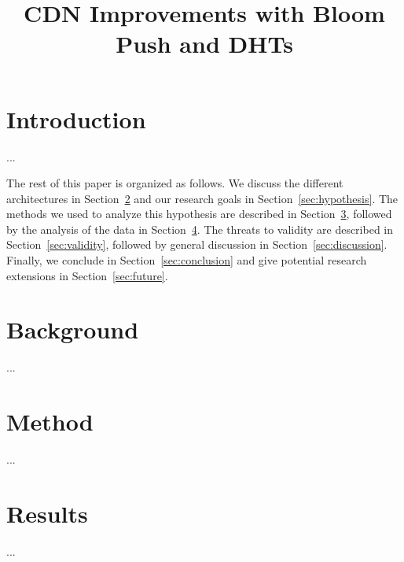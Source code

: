 \documentclass[conference]{IEEEtran}
\begin{document}
\title{CDN Improvements with Bloom Push and DHTs}

\author{
	\and
}

\maketitle
\thispagestyle{plain}
\pagestyle{plain}

\section{Introduction}\label{sec:intro}
...

The rest of this paper is organized as follows.  We discuss the different architectures in Section~\ref{sec:back} and our research goals in Section~\ref{sec:hypothesis}.  The methods we used to analyze this hypothesis are described in Section~\ref{sec:method}, followed by the analysis of the data in Section~\ref{sec:results}.  The threats to validity are described in Section~\ref{sec:validity}, followed by general discussion in Section~\ref{sec:discussion}.  Finally, we conclude in Section~\ref{sec:conclusion} and give potential research extensions in Section~\ref{sec:future}.

\section{Background}\label{sec:back}
...

\section{Method}\label{sec:method}
...

\section{Results}\label{sec:results}
...


\end{document}

